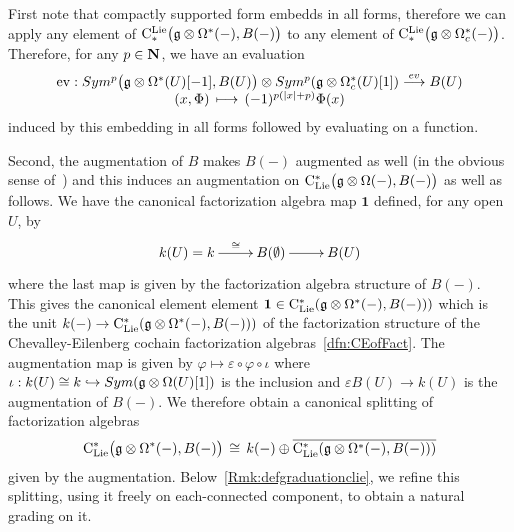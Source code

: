 \documentclass[11pt]{amsart}
\numberwithin{equation}{section}
\begin{document}
\smallskip 

First note that compactly supported form embedds in all forms, therefore we can apply 
any element of ${\rm C}^{\rm Lie}_*\big(\mathfrak g \otimes \Omega^* (-), B(-)\big)$ 
to any element of ${\rm C}^{\rm Lie}_*\big(\mathfrak g \otimes \Omega_c^* (-)\big)$. Therefore, for any  $p\in \mathbf N$, we have an evaluation 
\begin{equation} \label{eqdef:ev} \begin{array}{c}{\rm ev}: Sym^p \big( \mathfrak g \otimes \Omega^* (U)[-1] ,B(U)\big)
\otimes  Sym^p( \mathfrak g\otimes \Omega^*_c(U) [1]) \stackrel{ev}\longrightarrow B(U)  
  \\
 (x,\Phi) \,\longmapsto\, (-1)^{p(|x|+p) } \Phi (x)\end{array}
\end{equation} induced by this embedding  in all forms followed by evaluating on a function.



\smallskip

Second, the augmentation of $B$ makes $B(-)$ augmented as well (in the obvious sense of~\cite{Gi-NotesFactorization}) and this induces an augmentation on
${\rm C}_{\rm Lie}^*\big(\mathfrak g\otimes \Omega (-), B(-) \big)$ as well as follows. 
We have the canonical factorization algebra map  $\mathbf{1}$  defined, for any open $U$, by 
\[\xymatrix{ k(U)=k  \ar[r]^{\quad \cong}& 
B(\emptyset) \ar[r] & B(U)  } 
 \] where the last map is given by the factorization algebra structure of $B(-)$. This gives the canonical element element 
 $\mathbf{1}\in {\rm C}_{\rm Lie}^*(\mathfrak g\otimes \Omega^*(-), B(-)) )$ which is the unit $k(-)\to {\rm C}_{\rm Lie}^*(\mathfrak g\otimes \Omega^*(-), B(-)) )$
 of the factorization structure of 
 the Chevalley-Eilenberg cochain factorization algebras~\ref{dfn:CEofFact}.  
 The augmentation map is given by $\varphi\mapsto \varepsilon \circ \varphi \circ 
 \iota$ where $\iota: k(U) \cong k \hookrightarrow Sym(\mathfrak g \otimes \Omega (U) [1]) $ is the inclusion and $\varepsilon B(U)\to k(U)$ is the augmentation of 
 $B(-)$. We therefore obtain a canonical splitting of factorization algebras 
 \begin{equation}\label{eq:splittingbyaugm}
   {\rm C}_{\rm Lie}^*\big(\mathfrak g\otimes \Omega^*(-), B(-)\big)  \, \cong \, k(-) \oplus \overline{ {\rm C}_{\rm Lie}^*(\mathfrak g\otimes \Omega^*(-), B(-)) )}
 \end{equation}
given by the augmentation. Below~\ref{Rmk:defgraduationclie}, we refine  this splitting, using it  freely  on each-connected component, to obtain 
a natural grading on it.
 
 
\smallskip 
\end{document}
